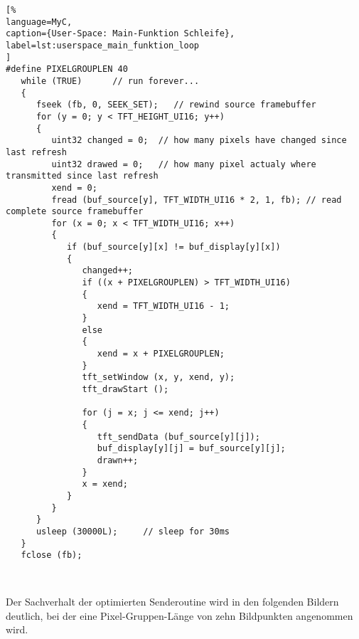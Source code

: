 \begin{lstlisting}[%
language=MyC,
caption={User-Space: Main-Funktion Schleife},
label=lst:userspace_main_funktion_loop
]
#define PIXELGROUPLEN 40
   while (TRUE)      // run forever...
   {
      fseek (fb, 0, SEEK_SET);   // rewind source framebuffer
      for (y = 0; y < TFT_HEIGHT_UI16; y++)
      {
         uint32 changed = 0;  // how many pixels have changed since last refresh
         uint32 drawed = 0;   // how many pixel actualy where transmitted since last refresh
         xend = 0;
         fread (buf_source[y], TFT_WIDTH_UI16 * 2, 1, fb); // read complete source framebuffer
         for (x = 0; x < TFT_WIDTH_UI16; x++)
         {
            if (buf_source[y][x] != buf_display[y][x])
            {
               changed++;
               if ((x + PIXELGROUPLEN) > TFT_WIDTH_UI16)
               {
                  xend = TFT_WIDTH_UI16 - 1;
               }
               else
               {
                  xend = x + PIXELGROUPLEN;
               }
               tft_setWindow (x, y, xend, y);
               tft_drawStart ();

               for (j = x; j <= xend; j++)
               {
                  tft_sendData (buf_source[y][j]);
                  buf_display[y][j] = buf_source[y][j];
                  drawn++;
               }
               x = xend;
            }
         }
      }
      usleep (30000L);     // sleep for 30ms
   }
   fclose (fb);



\end{lstlisting}
Der Sachverhalt der optimierten Senderoutine wird in den folgenden Bildern deutlich, bei der eine Pixel-Gruppen-Länge von zehn Bildpunkten angenommen wird. 

